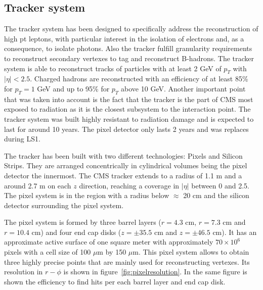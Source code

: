 \subsection{Tracker system}
\label{sec:tracker}

The tracker system has been designed to specifically address the reconstruction of high pt leptons, with particular interest in the isolation of electrons and, as a consequence, to isolate photons. Also the tracker fulfill granularity requirements to reconstruct secondary vertexes to tag and reconstruct B-hadrons. The tracker system is able to reconstruct tracks of particles with at least 2 GeV of $p_{T}$ with $|\eta|<2.5$. Charged hadrons are reconstructed with an efficiency of at least 85\% for $p_{T}=1$ GeV and up to 95\% for $p_{T}$ above 10 GeV. Another important point that was taken into account is the fact that the tracker is the part of CMS most exposed to radiation as it is the closest subsystem to the interaction point. The tracker system was built highly resistant to radiation damage and is expected to last for around 10 years. The pixel detector only lasts 2 years and was replaces during LS1. 

The tracker has been built with two different technologies: Pixels and Silicon Strips. They are arranged concentrically in cylindrical volumes being the pixel detector the innermost. The CMS tracker extends to a radius of 1.1 m and a around 2.7 m on each $z$ direction, reaching a coverage in $|\eta|$ between 0 and 2.5. The pixel system is in the region with a radius below $\approx$ 20 cm and the silicon detector surrounding the pixel system. %

The pixel system is formed by three barrel layers ($r=4.3$ cm, $r=7.3$ cm and $r=10.4$ cm) and four end cap disks ($z=\pm 35.5$ cm and $z=\pm 46.5$ cm). It has an approximate active surface of one square meter with approximately $70\times10^{6}$ pixels with a cell size of 100 $\mu$m by 150 $\mu$m. This pixel system allows to obtain three highly precise points that are mainly used for reconstructing vertexes. Its resolution in $r-\phi$ is shown in figure~\ref{fig:pixelresolution}. In the same figure is shown the efficiency to find hits per each barrel layer and end cap disk. 

